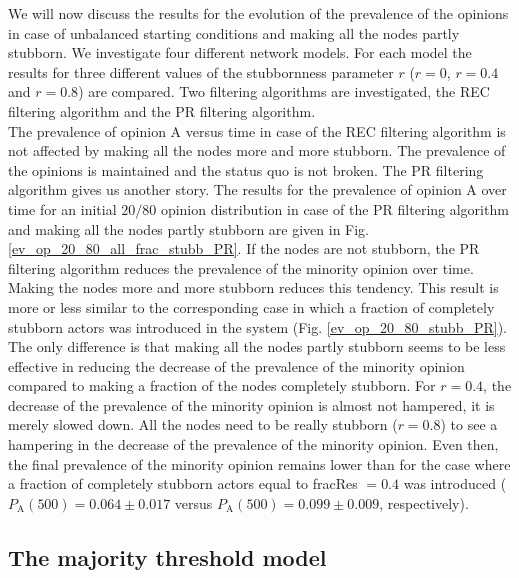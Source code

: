 \documentclass[11 pt , letterpaper , twoside , openright]{book}
\begin{document}
\noindent
We will now discuss the results for the evolution of the prevalence of the opinions in case of unbalanced starting conditions and making all the nodes partly stubborn. We investigate four different network models. For each model the results for three different values of the stubbornness parameter $r$ ($r=0$, $r=0.4$ and $r=0.8$) are compared. Two filtering algorithms are investigated, the REC filtering algorithm and the PR filtering algorithm.\\
\newline
The prevalence of opinion A versus time in case of the REC filtering algorithm is not affected by making all the nodes more and more stubborn. The prevalence of the opinions is maintained and the status quo is not broken. The PR filtering algorithm gives us another story. The results for the prevalence of opinion A over time for an initial $20/80$ opinion distribution in case of the PR filtering algorithm and making all the nodes partly stubborn are given in Fig. \ref{ev_op_20_80_all_frac_stubb_PR}. If the nodes are not stubborn, the PR filtering algorithm reduces the prevalence of the minority opinion over time. Making the nodes more and more stubborn reduces this tendency. This result is more or less similar to the corresponding case in which a fraction of completely stubborn actors was introduced in the system (Fig. \ref{ev_op_20_80_stubb_PR}). The only difference is that making all the nodes partly stubborn seems to be less effective in reducing the decrease of the prevalence of the minority opinion compared to making a fraction of the nodes completely stubborn. For $r=0.4$, the decrease of the prevalence of the minority opinion is almost not hampered, it is merely slowed down. All the nodes need to be really stubborn ($r=0.8$) to see a hampering in the decrease of the prevalence of the minority opinion. Even then, the final prevalence of the minority opinion remains lower than for the case where a fraction of completely stubborn actors equal to fracRes $=0.4$ was introduced ($P_\text{A}(500) = 0.064 \pm 0.017$ versus $P_\text{A}(500) = 0.099 \pm 0.009$, respectively).

\subsection{The majority threshold model}
\label{majThres}
\end{document}
